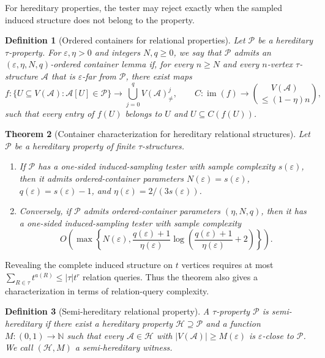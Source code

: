 \documentclass[11pt,reqno,letterpaper]{amsart}
\newcommand{\N}{{\mathbb N}}
\newcommand{\cA}{{\mathcal A}}
\newcommand{\cH}{{\mathcal H}}
\newcommand{\cP}{{\mathcal P}}
\theoremstyle{plain}
\newtheorem{thm}{Theorem}[section]
\newtheorem{defn}[thm]{Definition}
\theoremstyle{remark}
\begin{document}
For hereditary properties, the tester may reject exactly when the sampled induced structure does not belong to the property.

\begin{defn}[Ordered containers for relational properties]
Let $\cP$ be a hereditary $\tau$-property. For $\varepsilon,\eta>0$ and integers $N,q\geq0$, we say that $\cP$ admits an
$(\varepsilon,\eta,N,q)$-\textit{ordered container lemma} if, for every $n\geq N$ and every $n$-vertex $\tau$-structure $\cA$ that is $\varepsilon$-far from $\cP$, there exist maps
\[
f:\{U\subseteq V(\cA):\cA[U]\in\cP\}
\longrightarrow
\bigcup_{j=0}^{q}V(\cA)_{\neq}^{j},
\qquad
C:\operatorname{im}(f)
\longrightarrow
\binom{V(\cA)}{\leq(1-\eta)n},
\]
such that every entry of $f(U)$ belongs to $U$ and $U\subseteq C(f(U))$.
\end{defn}

\begin{thm}[Container characterization for hereditary relational structures]
\label{thm:relational-hereditary-characterization-intro}
Let $\cP$ be a hereditary property of finite $\tau$-structures.
\begin{enumerate}[label=\textnormal{(\roman*)}]
\item If $\cP$ has a one-sided induced-sampling tester with sample complexity $s(\varepsilon)$, then it admits ordered-container parameters
\(N(\varepsilon)=s(\varepsilon)\), \(q(\varepsilon)=s(\varepsilon)-1\), and \(\eta(\varepsilon)={2}/{(3s(\varepsilon))}\).

\item Conversely, if $\cP$ admits ordered-container parameters $(\eta,N,q)$, then it has a one-sided induced-sampling tester with sample complexity
\[
O\!\left(
\max\left\{
N(\varepsilon),
\frac{q(\varepsilon)+1}{\eta(\varepsilon)}
\log\left(
\frac{q(\varepsilon)+1}{\eta(\varepsilon)}+2
\right)
\right\}
\right).
\]

\end{enumerate}
\end{thm}

Revealing the complete induced structure on $t$ vertices requires at most $\sum_{R\in\tau}t^{a(R)}\leq|\tau|t^r$ relation queries. Thus the theorem also gives a characterization in terms of relation-query complexity.

\begin{defn}[Semi-hereditary relational property]
A $\tau$-property $\cP$ is \textit{semi-hereditary} if there exist a hereditary property $\cH\supseteq\cP$ and a function $M:(0,1)\to\N$ such that every $\cA\in\cH$ with $|V(\cA)|\geq M(\varepsilon)$ is $\varepsilon$-close to $\cP$. We call $(\cH,M)$ a \textit{semi-hereditary witness}.
\end{defn}
\end{document}
